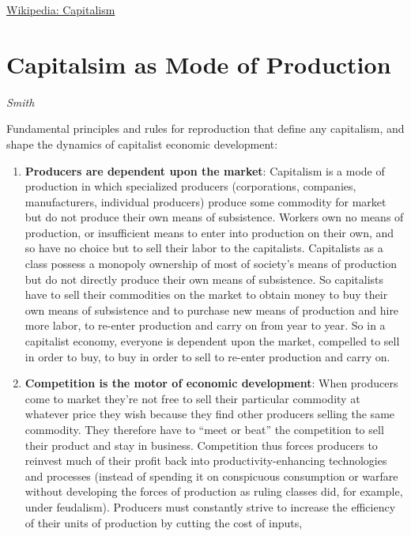 \documentclass[
]{book}
\begin{document}
\href{https://en.wikipedia.org/wiki/Capitalism}{Wikipedia: Capitalism}

\hypertarget{capitalsim-as-mode-of-production}{%
\section{Capitalsim as Mode of Production}\label{capitalsim-as-mode-of-production}}

\emph{Smith}

Fundamental principles and rules for reproduction that define any capitalism,
and shape the dynamics of capitalist economic development:

\begin{enumerate}
\def\labelenumi{\arabic{enumi}.}
\item
  \textbf{Producers are dependent upon the market}: Capitalism is a mode of production
  in which specialized producers (corporations, companies, manufacturers, individual
  producers) produce some commodity for market but do not produce their own means
  of subsistence. Workers own no means of production, or insufficient means to enter
  into production on their own, and so have no choice but to sell their labor to the
  capitalists. Capitalists as a class possess a monopoly ownership of most of society's
  means of production but do not directly produce their own means of subsistence. So
  capitalists have to sell their commodities on the market to obtain money to buy their
  own means of subsistence and to purchase new means of production and hire more
  labor, to re-enter production and carry on from year to year. So in a capitalist
  economy, everyone is dependent upon the market, compelled to sell in order to buy,
  to buy in order to sell to re-enter production and carry on.
\item
  \textbf{Competition is the motor of economic development}: When producers come to
  market they're not free to sell their particular commodity at whatever price they
  wish because they find other producers selling the same commodity. They therefore
  have to ``meet or beat'' the competition to sell their product and stay in business.
  Competition thus forces producers to reinvest much of their profit back into
  productivity-enhancing technologies and processes (instead of spending it on
  conspicuous consumption or warfare without developing the forces of production as
  ruling classes did, for example, under feudalism). Producers must constantly strive
  to increase the efficiency of their units of production by cutting the cost of inputs,

\end{enumerate}
\end{document}
